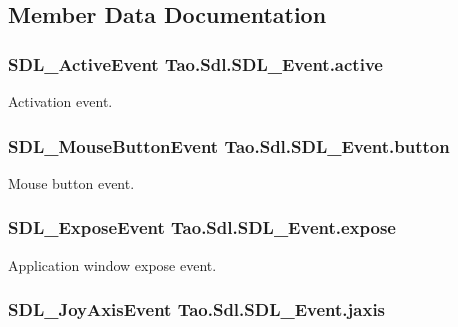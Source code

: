 \subsection{Member Data Documentation}
\hypertarget{struct_tao_1_1_sdl_1_1_s_d_l___event_acc827c48f34423b4f53f916de7426e4c}{
\subsubsection[{active}]{\setlength{\rightskip}{0pt plus 5cm}SDL\_\-ActiveEvent {\bf Tao.Sdl.SDL\_\-Event.active}}}
\label{struct_tao_1_1_sdl_1_1_s_d_l___event_acc827c48f34423b4f53f916de7426e4c}


Activation event. 

\hypertarget{struct_tao_1_1_sdl_1_1_s_d_l___event_a0e57a9bed65a5af87dd434091562b24f}{
\subsubsection[{button}]{\setlength{\rightskip}{0pt plus 5cm}SDL\_\-MouseButtonEvent {\bf Tao.Sdl.SDL\_\-Event.button}}}
\label{struct_tao_1_1_sdl_1_1_s_d_l___event_a0e57a9bed65a5af87dd434091562b24f}


Mouse button event. 

\hypertarget{struct_tao_1_1_sdl_1_1_s_d_l___event_a724b34721ac3b2d54f99e426c8c1a204}{
\subsubsection[{expose}]{\setlength{\rightskip}{0pt plus 5cm}SDL\_\-ExposeEvent {\bf Tao.Sdl.SDL\_\-Event.expose}}}
\label{struct_tao_1_1_sdl_1_1_s_d_l___event_a724b34721ac3b2d54f99e426c8c1a204}


Application window expose event. 

\hypertarget{struct_tao_1_1_sdl_1_1_s_d_l___event_afccc6a9dae0a4a2effdcf1628f8b93fa}{
\subsubsection[{jaxis}]{\setlength{\rightskip}{0pt plus 5cm}SDL\_\-JoyAxisEvent {\bf Tao.Sdl.SDL\_\-Event.jaxis}}}
\label{struct_tao_1_1_sdl_1_1_s_d_l___event_afccc6a9dae0a4a2effdcf1628f8b93fa}


